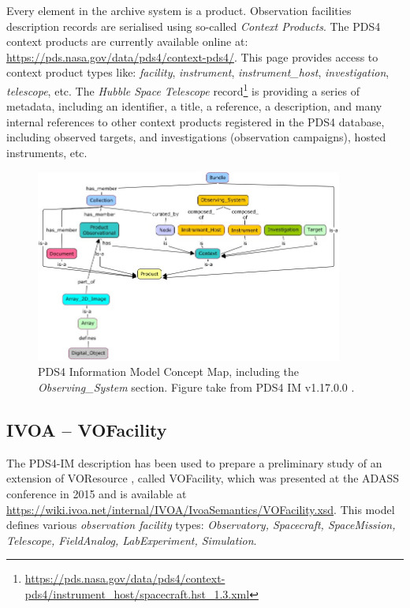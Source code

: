 \documentclass[11pt,a4paper]{ivoa}
\begin{document}
Every element in the archive system is a product. Observation
facilities description records are serialised using so-called
\emph{Context Products}. The PDS4 context
products are currently available online at:
\url{https://pds.nasa.gov/data/pds4/context-pds4/}. This
page provides access to context product types like: \emph{facility},
\emph{instrument}, \emph{instrument\_host}, \emph{investigation},
\emph{telescope}, etc. The \emph{Hubble Space Telescope}
record\footnote{\protect\url{https://pds.nasa.gov/data/pds4/context-pds4/instrument_host/spacecraft.hst_1.3.xml}}
is providing a series of metadata, including an identifier, a title,
a reference, a description, and many internal references to other
context products registered in the PDS4 database, including
observed targets, and investigations (observation campaigns), hosted
instruments, etc.

\begin{figure}
\centering\includegraphics[width=0.9\textwidth]{pds4-concept-map.jpg}
\caption{PDS4 Information Model Concept Map, including the
\emph{Observing\_System} section. Figure take from PDS4 IM v1.17.0.0
\protect\citep{pds4-im-v1H00}.}\label{fig:pds4-concept-map}
\end{figure}

\subsection{IVOA -- VOFacility}

The PDS4-IM description has been used to prepare a preliminary study of
an extension of VOResource \citep{2018ivoa.spec.0625P}, called VOFacility,
which was presented at the ADASS conference in 2015 \citep{Louys:2015to}
and is available at \url{https://wiki.ivoa.net/internal/IVOA/IvoaSemantics/VOFacility.xsd}.
This model defines various \emph{observation facility} types:
\emph{Observatory, Spacecraft, SpaceMission, Telescope, FieldAnalog,
LabExperiment, Simulation}.
\end{document}
